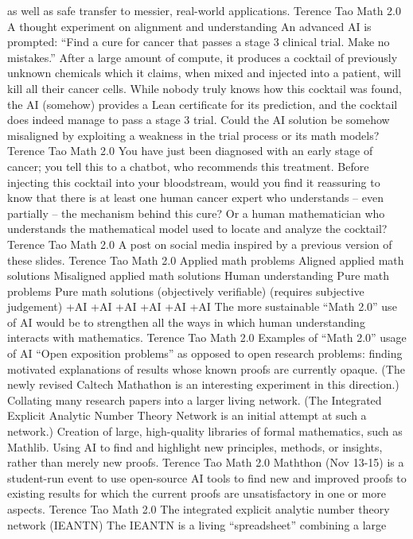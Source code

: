 as well as safe transfer to messier, real-world applications.
Terence Tao
Math 2.0
A thought experiment on alignment and understanding
An advanced AI is prompted: “Find a cure for cancer that
passes a stage 3 clinical trial. Make no mistakes.”
After a large amount of compute, it produces a cocktail of
previously unknown chemicals which it claims, when mixed
and injected into a patient, will kill all their cancer cells.
While nobody truly knows how this cocktail was found, the
AI (somehow) provides a Lean certificate for its prediction,
and the cocktail does indeed manage to pass a stage 3
trial.
Could the AI solution be somehow misaligned by exploiting
a weakness in the trial process or its math models?
Terence Tao
Math 2.0
You have just been diagnosed with an early stage of
cancer; you tell this to a chatbot, who recommends this
treatment.
Before injecting this cocktail into your bloodstream, would
you find it reassuring to know that there is at least one
human cancer expert who understands – even partially –
the mechanism behind this cure?
Or a human mathematician who understands the
mathematical model used to locate and analyze the
cocktail?
Terence Tao
Math 2.0
A post on social media inspired by a previous version of these slides.
Terence Tao
Math 2.0
Applied math
problems
Aligned applied
math solutions
Misaligned applied
math solutions
Human
understanding
Pure math
problems
Pure math
solutions
(objectively verifiable)
(requires subjective
judgement)
+AI
+AI
+AI
+AI
+AI
+AI
The more sustainable “Math 2.0” use of AI would be to
strengthen all the ways in which human understanding interacts
with mathematics.
Terence Tao
Math 2.0
Examples of “Math 2.0” usage of AI
“Open exposition problems” as opposed to open research
problems: finding motivated explanations of results whose
known proofs are currently opaque. (The newly revised
Caltech Mathathon is an interesting experiment in this
direction.)
Collating many research papers into a larger living
network. (The Integrated Explicit Analytic Number Theory
Network is an initial attempt at such a network.)
Creation of large, high-quality libraries of formal
mathematics, such as Mathlib.
Using AI to find and highlight new principles, methods, or
insights, rather than merely new proofs.
Terence Tao
Math 2.0
Maththon (Nov 13-15) is a student-run event to use
open-source AI tools to find new and improved proofs to
existing results for which the current proofs are unsatisfactory
in one or more aspects.
Terence Tao
Math 2.0
The integrated explicit analytic number theory network (IEANTN)
The IEANTN is a living “spreadsheet” combining a large
